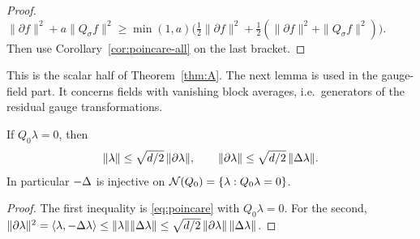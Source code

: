 \begin{proof}
$\|\partial f\|^2+a\|Q_\sigma f\|^2\ge\min(1,a)\big(\frac12\|\partial f\|^2+\frac12(\|\partial f\|^2+\|Q_\sigma f\|^2)\big)$. Then use Corollary~\ref{cor:poincare-all} on the last bracket.
\end{proof}

This is the scalar half of Theorem~\ref{thm:A}. The next lemma is used in the gauge-field part. It concerns fields with vanishing block averages, i.e.\ generators of the residual gauge transformations.

\begin{lemma}\label{lem:kerQ0}
If $Q_0\lambda=0$, then
\[
\|\lambda\|\le\sqrt{d/2}\,\|\partial\lambda\|,\qquad \|\partial\lambda\|\le\sqrt{d/2}\,\|\Delta\lambda\| .
\]
In particular $-\Delta$ is injective on $\mathcal N(Q_0)=\{\lambda:Q_0\lambda=0\}$.
\end{lemma}

\begin{proof}
The first inequality is \eqref{eq:poincare} with $Q_0\lambda=0$. For the second, $\|\partial\lambda\|^2=\langle \lambda,-\Delta\lambda\rangle\le\|\lambda\|\|\Delta\lambda\|\le\sqrt{d/2}\,\|\partial\lambda\|\,\|\Delta\lambda\|$.
\end{proof}

